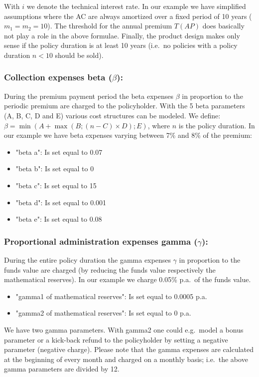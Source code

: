\begin{itemize}
With $i$ we denote the technical interest rate. In our example we have simplified assumptions where the AC are always amortized over a fixed period of 10 years ($m_1 = m_2 = 10$). The threshold for the annual premium $T(AP)$ does basically not play a role in the above formulae. Finally, the product design makes only sense if the policy duration is at least 10 years (i.e.~no policies with a policy duration $n < 10$ should be sold).
\end{itemize}

\subsubsection{Collection expenses beta ($\beta$):}

During the premium payment period the beta expenses $\beta$ in proportion to the periodic premium are charged to the policyholder. With the 5 beta parameters (A, B, C, D and E) various cost structures can be modeled. We define: 
$\beta = \min (A + \max (B;(n-C) \times D); E)$, where $n$ is the policy duration. In our example we have beta expenses varying between 7\% and 8\% of the premium:
\begin{itemize}
	\item "beta a": Is set equal to 0.07
	\item "beta b": Is set equal to 0
	\item "beta c": Is set equal to 15
	\item "beta d": Is set equal to 0.001
	\item "beta e": Is set equal to 0.08
\end{itemize}

\subsubsection{Proportional administration expenses gamma ($\gamma$):}

During the entire policy duration the gamma expenses $\gamma$ in proportion to the funds value are charged (by reducing the funds value respectively the mathematical reserves).
In our example we charge 0.05\% p.a.~of the funds value.
\begin{itemize}
	\item "gamma1 of mathematical reserves": Is set equal to 0.0005 p.a.~
	\item "gamma2 of mathematical reserves": Is set equal to 0 p.a.~
\end{itemize}
We have two gamma parameters. With gamma2 one could e.g.~model a bonus parameter or a kick-back refund to the policyholder by setting a negative parameter (negative charge).
Please note that the gamma expenses are calculated at the beginning of every month and charged on a monthly basis; i.e.~the above gamma parameters are divided by 12.

